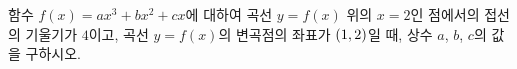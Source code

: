 함수 $f(x)=ax^3+bx^2+cx$에 대하여 곡선 $y=f(x)$ 위의 $x=2$인 점에서의 접선의 기울기가 $4$이고, 곡선 $y=f(x)$의 변곡점의 좌표가 $(1{,}\mkern3mu\mathopen{}2)$일 때, 상수 $a$, $b$, $c$의 값을 구하시오.
